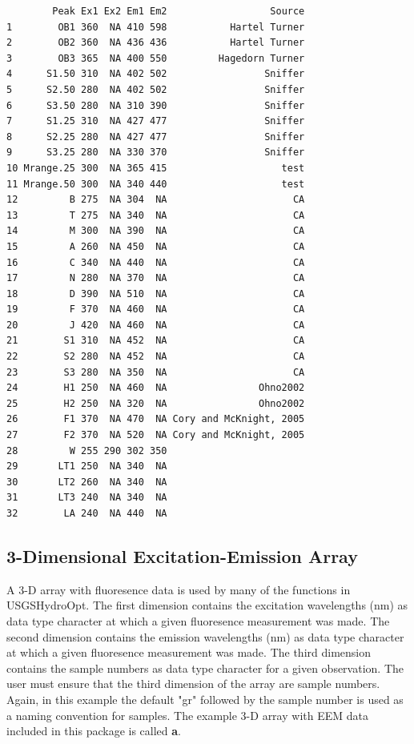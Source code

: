 \documentclass[a4paper,11pt]{article}\usepackage[]{graphicx}\usepackage[]{color}
\makeatletter
\newenvironment{kframe}{%
 \def\at@end@of@kframe{}%
 \ifinner\ifhmode%
  \def\at@end@of@kframe{\end{minipage}}%
  \begin{minipage}{\columnwidth}%
 \fi\fi%
 \def\FrameCommand##1{\hskip\@totalleftmargin \hskip-\fboxsep
 \colorbox{shadecolor}{##1}\hskip-\fboxsep
     \hskip-\linewidth \hskip-\@totalleftmargin \hskip\columnwidth}%
 \MakeFramed {\advance\hsize-\width
   \@totalleftmargin\z@ \linewidth\hsize
   \@setminipage}}%
 {\par\unskip\endMakeFramed%
 \at@end@of@kframe}
\newenvironment{knitrout}{}{} %
\makeatother
\begin{document}
\begin{knitrout}
\color{fgcolor}\begin{kframe}
\begin{verbatim}
        Peak Ex1 Ex2 Em1 Em2                  Source
1        OB1 360  NA 410 598           Hartel Turner
2        OB2 360  NA 436 436           Hartel Turner
3        OB3 365  NA 400 550         Hagedorn Turner
4      S1.50 310  NA 402 502                 Sniffer
5      S2.50 280  NA 402 502                 Sniffer
6      S3.50 280  NA 310 390                 Sniffer
7      S1.25 310  NA 427 477                 Sniffer
8      S2.25 280  NA 427 477                 Sniffer
9      S3.25 280  NA 330 370                 Sniffer
10 Mrange.25 300  NA 365 415                    test
11 Mrange.50 300  NA 340 440                    test
12         B 275  NA 304  NA                      CA
13         T 275  NA 340  NA                      CA
14         M 300  NA 390  NA                      CA
15         A 260  NA 450  NA                      CA
16         C 340  NA 440  NA                      CA
17         N 280  NA 370  NA                      CA
18         D 390  NA 510  NA                      CA
19         F 370  NA 460  NA                      CA
20         J 420  NA 460  NA                      CA
21        S1 310  NA 452  NA                      CA
22        S2 280  NA 452  NA                      CA
23        S3 280  NA 350  NA                      CA
24        H1 250  NA 460  NA                Ohno2002
25        H2 250  NA 320  NA                Ohno2002
26        F1 370  NA 470  NA Cory and McKnight, 2005
27        F2 370  NA 520  NA Cory and McKnight, 2005
28         W 255 290 302 350                        
29       LT1 250  NA 340  NA                        
30       LT2 260  NA 340  NA                        
31       LT3 240  NA 340  NA                        
32        LA 240  NA 440  NA                        
\end{verbatim}
\end{kframe}
\end{knitrout}

\subsection{3-Dimensional Excitation-Emission Array}
A 3-D array with fluoresence data is used by many of the functions in USGSHydroOpt. The first dimension contains the excitation wavelengths (nm) as data type character at which a given fluoresence measurement was made. The second dimension contains the emission wavelengths (nm) as data type character at which a given fluoresence measurement was made. The third dimension contains the sample numbers as data type character for a given observation. The user must ensure that the third dimension of the array are sample numbers. Again, in this example the default "gr" followed by the sample number is used as a naming convention for samples. The example 3-D array with EEM data included in this package is called \textbf{a}.
\end{document}
